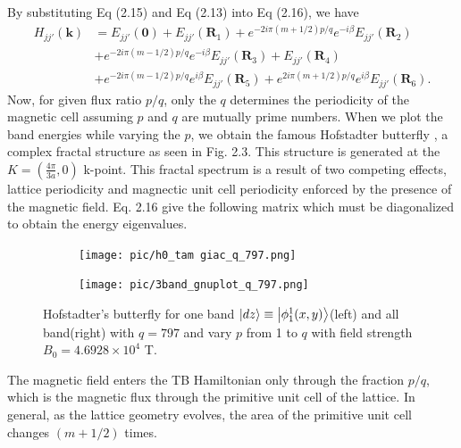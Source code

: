 \documentclass{report}
\begin{document}
By substituting Eq (2.15) and Eq (2.13) into Eq (2.16), we have
\begin{equation}
	\begin{aligned}
		H_{jj'}(\mathbf{k})
		 & = E_{jj'}(\mathbf{0}) + E_{jj'}(\mathbf{R}_{1}) + e^{-2i\pi(m + 1/2)p / q} e^{-i\beta} E_{jj'}(\mathbf{R}_{2})              \\
		 & + e^{-2i\pi(m - 1/2)p / q} e^{-i\beta} E_{jj'}(\mathbf{R}_{3}) + E_{jj'}(\mathbf{R}_{4})                                    \\
		 & + e^{-2i\pi(m - 1/2)p / q} e^{i\beta} E_{jj'}(\mathbf{R}_{5}) + e^{2i\pi(m + 1/2)p / q} e^{i\beta} E_{jj'}(\mathbf{R}_{6}).
	\end{aligned}
\end{equation}
Now, for given flux ratio $p/q$, only the $q$ determines the periodicity of the magnetic cell assuming $p$ and $q$ are mutually prime numbers. When we plot the band energies while varying the $p$, we obtain the famous Hofstadter butterfly \cite{PhysRevB.14.2239}, a complex fractal structure as seen in Fig. 2.3. This structure is generated at the $K = (\frac{4\pi}{3a},0)$ k-point. This fractal spectrum is a result of two competing effects, lattice periodicity and magnectic unit cell periodicity enforced by the presence of the magnetic field. Eq. 2.16 give the following matrix which must be diagonalized to obtain the energy eigenvalues.
\begin{figure}[htb]
	\centering
	\begin{subfigure}[b]{0.495\textwidth}
		\centering
		\texttt{[image: pic/h0\_tam giac\_q\_797.png]}
		\label{fig:3 band}
	\end{subfigure}
	\begin{subfigure}[b]{0.495\textwidth}
		\centering
		\texttt{[image: pic/3band\_gnuplot\_q\_797.png]}
		\label{fig:1 band}
	\end{subfigure}
	\caption{
		Hofstadter’s butterfly for one band $\ket{dz} \equiv \ket{\phi_{1}^{1}(x,y)}$(left) and all band(right) with $q = 797$ and vary $p$  from 1 to $q$ with field strength $B_{0} = 4.6928 \times 10^{4}$ T.
	}
\end{figure}

The magnetic field enters the TB Hamiltonian only through the fraction $p/q$, which is the magnetic flux through the primitive unit cell of the lattice. In general, as the lattice geometry evolves, the area of the primitive unit cell changes $(m + 1/2)$ times.
\end{document}
